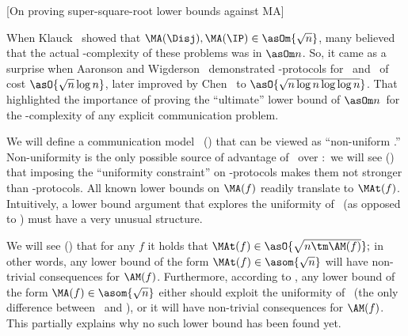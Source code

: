 [On proving super-square-root lower bounds against MA]

%
%
%
%
When Klauck~\cite{K03_Rec} showed that $\MA(\Disj), \MA(\IP)\in\asOm{\sqrt n}$, many believed that the actual \MA-complexity of these problems was in $\asOm n$.
So, it came as a surprise when Aaronson and Wigderson~\cite{AW08_Alg} demonstrated \MA-protocols for \Disj\ and \IP\ of cost $\asO{\sqrt n\log n}$, later improved by Chen~\cite{C18_On} to $\asO{\sqrt {n\log n\log\log n}}$.
That %
highlighted   %
the importance of proving the ``ultimate'' lower bound of $\asOm n$\ for the \MA-complexity of any explicit communication problem.

%
%

We will define a communication model \MAt\ () that can be viewed as ``non-uniform \MA.''
Non-uniformity is the only possible source of advantage of \MAt\ over \MA:\ we will see () that imposing the ``uniformity constraint'' on \MAt-protocols makes them not stronger than \MA-protocols.
All known lower bounds on $\MA(f)$ readily translate to $\MAt(f)$.
Intuitively, a lower bound argument that explores the uniformity of \MA\ (as opposed to \MAt) must have a very unusual structure.

We will see () that for any $f$ it holds that
$
\MAt(f) \in \asO{\sqrt{n\tm\AM(f)}}
;$
in other words, any lower bound of the form $\MAt(f) \in \asom{\sqrt n}$ will have non-trivial consequences for $\AM(f)$.
Furthermore, according to , any lower bound of the form $\MA(f) \in \asom{\sqrt n}$ either should exploit the uniformity of \MA\ (the only difference between \MA\ and \MAt), or it will have non-trivial consequences for $\AM(f)$.
This partially explains why no such lower bound has been found yet.


